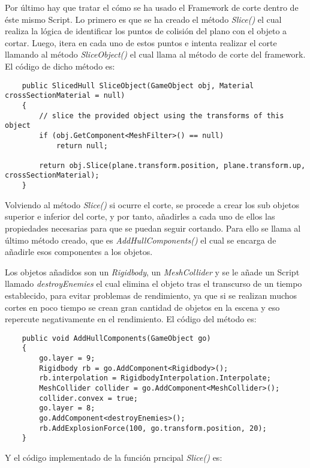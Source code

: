 Por último hay que tratar el cómo se ha usado el Framework de corte dentro de éste mismo Script. Lo primero es que se ha creado el método \textit{Slice()} el cual realiza la lógica de identificar los puntos de colisión del plano con el objeto a cortar. Luego, itera en cada uno de estos puntos e intenta realizar el corte llamando al método \textit{SliceObject()} el cual llama al método de corte del framework. El código de dicho método es: 

\begin{lstlisting}
    public SlicedHull SliceObject(GameObject obj, Material crossSectionMaterial = null)
    {
        // slice the provided object using the transforms of this object
        if (obj.GetComponent<MeshFilter>() == null)
            return null;

        return obj.Slice(plane.transform.position, plane.transform.up, crossSectionMaterial);
    }
\end{lstlisting}

Volviendo al método \textit{Slice()} si ocurre el corte, se procede a crear los sub objetos superior e inferior del corte, y por tanto, añadirles a cada uno de ellos las propiedades necesarias para que se puedan seguir cortando. Para ello se llama al último método creado, que es \textit{AddHullComponents()} el cual se encarga de añadirle esos componentes a los objetos.

Los objetos añadidos son un \textit{Rigidbody}, un \textit{MeshCollider} y se le añade un Script llamado \textit{destroyEnemies} el cual elimina el objeto tras el transcurso de un tiempo establecido, para evitar problemas de rendimiento, ya que si se realizan muchos cortes en poco tiempo se crean gran cantidad de objetos en la escena y eso repercute negativamente en el rendimiento. El código del método es:

\begin{lstlisting}
    public void AddHullComponents(GameObject go)
    {
        go.layer = 9;
        Rigidbody rb = go.AddComponent<Rigidbody>();
        rb.interpolation = RigidbodyInterpolation.Interpolate;
        MeshCollider collider = go.AddComponent<MeshCollider>();
        collider.convex = true;
        go.layer = 8;
        go.AddComponent<destroyEnemies>();
        rb.AddExplosionForce(100, go.transform.position, 20);
    }
\end{lstlisting}

Y el código implementado de la función prncipal \textit{Slice()} es: 

